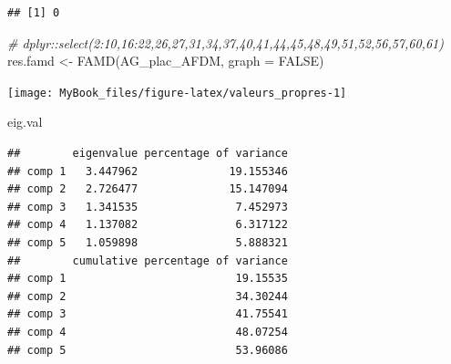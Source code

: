 \documentclass[
  12pt,
  american,
  a4paper,
  extrafontsizes,onecolumn,openright
  ]{memoir}
\newenvironment{Shaded}{\begin{snugshade}}{\end{snugshade}}
\newcommand{\AttributeTok}[1]{\textcolor[rgb]{0.77,0.63,0.00}{#1}}
\newcommand{\CommentTok}[1]{\textcolor[rgb]{0.56,0.35,0.01}{\textit{#1}}}
\newcommand{\ConstantTok}[1]{\textcolor[rgb]{0.00,0.00,0.00}{#1}}
\newcommand{\DecValTok}[1]{\textcolor[rgb]{0.00,0.00,0.81}{#1}}
\newcommand{\FunctionTok}[1]{\textcolor[rgb]{0.00,0.00,0.00}{#1}}
\newcommand{\NormalTok}[1]{#1}
\newcommand{\OtherTok}[1]{\textcolor[rgb]{0.56,0.35,0.01}{#1}}
\newcommand{\SpecialCharTok}[1]{\textcolor[rgb]{0.00,0.00,0.00}{#1}}
\newcommand{\StringTok}[1]{\textcolor[rgb]{0.31,0.60,0.02}{#1}}
\begin{document}
\begin{verbatim}
## [1] 0
\end{verbatim}

\begin{Shaded}
\begin{Highlighting}[]
\CommentTok{\# dplyr::select(2:10,16:22,26,27,31,34,37,40,41,44,45,48,49,51,52,56,57,60,61)}
\NormalTok{res.famd }\OtherTok{\textless{}{-}} \FunctionTok{FAMD}\NormalTok{(AG\_plac\_AFDM, }\AttributeTok{graph =} \ConstantTok{FALSE}\NormalTok{)}
\end{Highlighting}
\end{Shaded}

\normalsize

\scriptsize

\begin{Shaded}
\end{Shaded}

\begin{center}\texttt{[image: MyBook\_files/figure-latex/valeurs\_propres-1]} \end{center}

\begin{Shaded}
\begin{Highlighting}[]
\NormalTok{eig.val}
\end{Highlighting}
\end{Shaded}

\begin{verbatim}
##        eigenvalue percentage of variance
## comp 1   3.447962              19.155346
## comp 2   2.726477              15.147094
## comp 3   1.341535               7.452973
## comp 4   1.137082               6.317122
## comp 5   1.059898               5.888321
##        cumulative percentage of variance
## comp 1                          19.15535
## comp 2                          34.30244
## comp 3                          41.75541
## comp 4                          48.07254
## comp 5                          53.96086
\end{verbatim}
\end{document}
